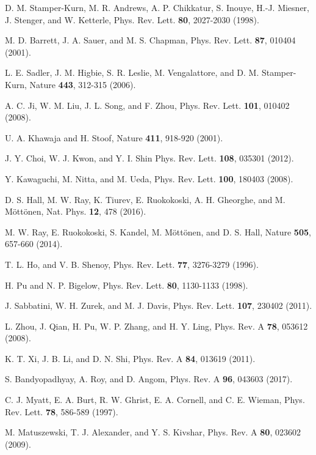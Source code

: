 \documentclass[aps,pra,showpacs,twocolumn,superscriptaddress]{revtex4-1}
\begin{document}
\begin{thebibliography}{99}
D. M. Stamper-Kurn, M. R. Andrews, A. P. Chikkatur, S. Inouye, H.-J. Miesner, J. Stenger, and W. Ketterle,
Phys. Rev. Lett. \textbf{80}, 2027-2030 (1998).

M. D. Barrett, J. A. Sauer, and M. S. Chapman,
Phys. Rev. Lett. \textbf{87}, 010404 (2001).

L. E. Sadler, J. M. Higbie, S. R. Leslie, M. Vengalattore, and D. M. Stamper-Kurn,
Nature \textbf{443}, 312-315 (2006).

A. C. Ji, W. M. Liu, J. L. Song, and F. Zhou,
Phys. Rev. Lett. \textbf{101}, 010402 (2008).

U. A. Khawaja and H. Stoof,
Nature \textbf{411}, 918-920 (2001).

J. Y. Choi, W. J. Kwon, and Y. I. Shin
Phys. Rev. Lett. \textbf{108}, 035301 (2012).

Y. Kawaguchi, M. Nitta, and M. Ueda,
Phys. Rev. Lett. \textbf{100}, 180403 (2008).

D. S. Hall, M. W. Ray, K. Tiurev, E. Ruokokoski, A. H. Gheorghe, and M. M\"{o}tt\"{o}nen,
Nat. Phys. \textbf{12}, 478 (2016).

M. W. Ray, E. Ruokokoski, S. Kandel, M. M\"{o}tt\"{o}nen, and D. S. Hall,
Nature \textbf{505}, 657-660 (2014).


T. L. Ho, and V. B. Shenoy,
Phys. Rev. Lett. \textbf{77}, 3276-3279 (1996).


H. Pu and N. P. Bigelow,
Phys. Rev. Lett. \textbf{80}, 1130-1133 (1998).

J. Sabbatini, W. H. Zurek, and M. J. Davis,
Phys. Rev. Lett. \textbf{107}, 230402 (2011).

L. Zhou, J. Qian, H. Pu, W. P. Zhang, and H. Y. Ling,
Phys. Rev. A \textbf{78}, 053612 (2008).

K. T. Xi, J. B. Li, and D. N. Shi,
Phys. Rev. A \textbf{84}, 013619 (2011).

S. Bandyopadhyay, A. Roy, and D. Angom,
Phys. Rev. A \textbf{96}, 043603 (2017).

C. J. Myatt, E. A. Burt, R. W. Ghrist, E. A. Cornell, and C. E. Wieman,
Phys. Rev. Lett. \textbf{78}, 586-589 (1997).

M. Matuszewski, T. J. Alexander, and Y. S. Kivshar,
Phys. Rev. A \textbf{80}, 023602 (2009).


\end{thebibliography}
\end{document}

